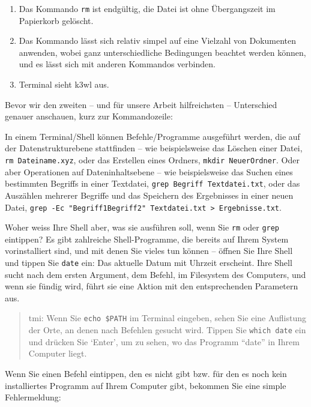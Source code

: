 \documentclass[
  letterpaper,
]{book}
\providecommand{\tightlist}{%
  \setlength{\itemsep}{0pt}\setlength{\parskip}{0pt}}\usepackage{longtable,booktabs,array}
\begin{document}
\begin{enumerate}
\def\labelenumi{\arabic{enumi}.}
\tightlist
\item
  Das Kommando \texttt{rm} ist endgültig, die Datei ist ohne
  Übergangszeit im Papierkorb gelöscht.
\item
  Das Kommando lässt sich relativ simpel auf eine Vielzahl von
  Dokumenten anwenden, wobei ganz unterschiedliche Bedingungen beachtet
  werden können, und es lässt sich mit anderen Kommandos verbinden.
\item
  Terminal sieht k3wl aus.
\end{enumerate}

Bevor wir den zweiten -- und für unsere Arbeit hilfreichsten --
Unterschied genauer anschauen, kurz zur Kommandozeile:

In einem Terminal/Shell können Befehle/Programme ausgeführt werden, die
auf der Datenstrukturebene stattfinden -- wie beispielsweise das Löschen
einer Datei, \texttt{rm\ Dateiname.xyz}, oder das Erstellen eines
Ordners, \texttt{mkdir\ NeuerOrdner}. Oder aber Operationen auf
Dateninhaltsebene -- wie beispielsweise das Suchen eines bestimmten
Begriffs in einer Textdatei, \texttt{grep\ Begriff\ Textdatei.txt}, oder
das Auszählen mehrerer Begriffe und das Speichern des Ergebnisses in
einer neuen Datei,
\texttt{grep\ -Ec\ "Begriff1\textbar{}Begriff2"\ Textdatei.txt\ \textgreater{}\ Ergebnisse.txt}.

Woher weiss Ihre Shell aber, was sie ausführen soll, wenn Sie
\texttt{rm} oder \texttt{grep} eintippen? Es gibt zahlreiche
Shell-Programme, die bereits auf Ihrem System vorinstalliert sind, und
mit denen Sie vieles tun können -- öffnen Sie Ihre Shell und tippen Sie
\texttt{date} ein: Das aktuelle Datum mit Uhrzeit erscheint. Ihre Shell
sucht nach dem ersten Argument, dem Befehl, im Filesystem des Computers,
und wenn sie fündig wird, führt sie eine Aktion mit den entsprechenden
Parametern aus.

\begin{quote}
tmi: Wenn Sie \texttt{echo\ \$PATH} im Terminal eingeben, sehen Sie eine
Auflistung der Orte, an denen nach Befehlen gesucht wird. Tippen Sie
\texttt{which\ date} ein und drücken Sie `Enter', um zu sehen, wo das
Programm ``date'' in Ihrem Computer liegt.
\end{quote}

Wenn Sie einen Befehl eintippen, den es nicht gibt bzw. für den es noch
kein installiertes Programm auf Ihrem Computer gibt, bekommen Sie eine
simple Fehlermeldung:
\end{document}

